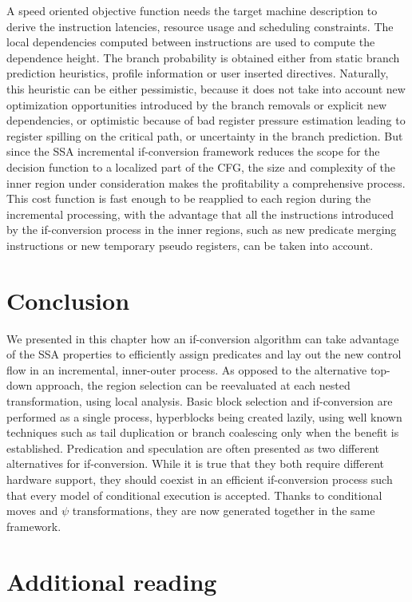 A speed oriented objective function needs the target machine description to derive the instruction latencies, resource usage and scheduling constraints. The local dependencies computed between instructions are used to compute the dependence height. The branch probability is obtained either from static branch prediction heuristics, profile information or user inserted directives. Naturally, this heuristic can be either pessimistic, because it does not take into account new optimization opportunities introduced by the branch removals or explicit new dependencies, or optimistic because of bad register pressure estimation leading to register spilling on the critical path, or uncertainty in the branch prediction. But since the SSA incremental if-conversion framework reduces the scope for the decision function to a localized part of the CFG, the size and complexity of the inner region under consideration makes the profitability a comprehensive process. This cost function is fast enough to be reapplied to each region during the incremental processing, with the advantage that all the instructions introduced by the if-conversion process in the inner regions, such as new predicate merging instructions or new temporary pseudo registers, can be taken into account.

\section{Conclusion} 

We presented in this chapter how an if-conversion algorithm can take advantage of the SSA properties to efficiently assign predicates and lay out the new control flow in an incremental, inner-outer process. As opposed to the alternative top-down approach, the region selection can be reevaluated at each nested transformation, using local analysis.
Basic block selection and if-conversion are performed as a single process, hyperblocks being created lazily, using well known techniques such as tail duplication or branch coalescing only when the benefit is established.
Predication and speculation are often presented as two different alternatives for if-conversion. While it is true that they both require different hardware support, they should coexist in an efficient if-conversion process such that every model of conditional execution is accepted. Thanks to conditional moves and $\psi$ transformations, they are now generated together in the same framework.

\section{Additional reading}


